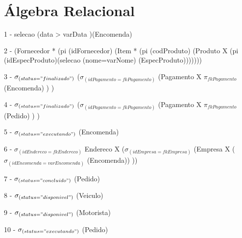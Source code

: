 \documentclass[12pt, onecolumn, titlepage]{article}
\begin{document}
\section{Álgebra Relacional}
\label{sect:algebra}

1 - selecao (data > varData )(Encomenda)

2 - (Fornecedor * (pi (idFornecedor) (Item * (pi (codProduto) (Produto X (pi (idEspecProduto)(selecao (nome=varNome) (EspecProduto)))))))

3 - $\sigma _{(status="finalizado")}$ ($\sigma _{(idPagamento=fkPagamento)}$ (Pagamento X $\pi_{fkPagamento}$ (Encomenda) ) )

4 - $\sigma _{(status="finalizado")}$ ($\sigma _{(idPagamento=fkPagamento)}$ (Pagamento X $\pi_{fkPagamento}$ (Pedido) ) )

5 - $\sigma _{(status="executando")}$ (Encomenda)

6 - $\sigma _{(idEndereco=fkEndereco)}$ Endereco X ($\sigma _{(idEmpresa=fkEmpresa)}$ (Empresa X ($\sigma _{(idEncomenda=varEncomenda)}$ (Encomenda)) )) 

7 - $\sigma _{(status="concluido")}$ (Pedido)

8 - $\sigma _{(status="disponivel")}$ (Veiculo)

9 - $\sigma _{(status="disponivel")}$ (Motorista)

10 - $\sigma _{(status="executando")}$ (Pedido)
\end{document}
